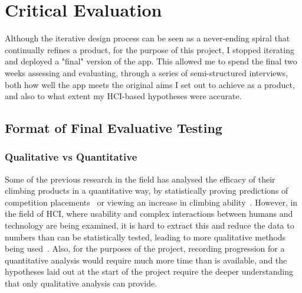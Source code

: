 \chapter{Critical Evaluation}
\label{chap:evaluation}







Although the iterative design process can be seen as a never-ending spiral that continually refines a product, for the purpose of this project, I stopped iterating and deployed a "final" version of the app.
This allowed me to spend the final two weeks assessing and evaluating, through a series of semi-structured interviews, both how well the app meets the original aims I set out to achieve as a product, and also to what extent my HCI-based hypotheses were accurate.

\section{Format of Final Evaluative Testing}
\subsection{Qualitative vs Quantitative}
Some of the previous research in the field has analysed the efficacy of their climbing products in a quantitative way, by statistically proving predictions of competition placements~\cite{climbaxstudy} or viewing an increase in climbing ability~\cite{climbbsn}. 
However, in the field of HCI, where usability and complex interactions between humans and technology are being examined, it is hard to extract this and reduce the data to numbers than can be statistically tested, leading to more qualitative methods being used~\cite{oro11911}.
Also, for the purposes of the project, recording progression for a quantitative analysis would require much more time than is available, and the hypotheses laid out at the start of the project require the deeper understanding that only qualitative analysis can provide.

